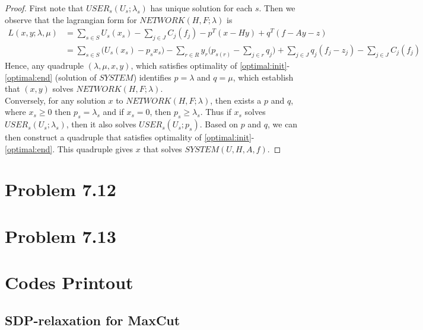 \documentclass[11pt,a4paper]{article}
\begin{document}
\begin{proof}
    First note that $USER_s(U_s;\lambda_s)$ has unique solution for each $s$.
    Then we observe that the lagrangian form for $NETWORK(H, F; \lambda)$ is 
    \begin{align}
    L(x, y; \lambda, \mu) 
    &= \sum_{s \in S} U_s(x_s) - \sum_{j \in J} C_j(f_j) 
    - p^T (x - H y) + q^T (f - A y - z) \\
    &= \sum_{s \in S} \big( U_s(x_s) -p_s x_s \big) 
    - \sum_{r \in R} y_r \big( p_{s(r)} - \sum_{j \in r} q_j \big)
    + \sum_{j \in J} q_j (f_j - z_j) -\sum_{j \in J} C_j(f_j)
    \end{align}
    Hence, any quadruple $(\lambda,\mu, x,y)$, which satisfies optimality of
    \ref{optimal:init}-\ref{optimal:end} (solution of $SYSTEM$) identifies $p=\lambda$ and
    $q=\mu$, which establish that $(x,y)$ solves $NETWORK(H, F; \lambda)$. \\
    Conversely, for any solution $x$ to $NETWORK(H, F; \lambda)$, then exists
    a $p$ and $q$, where $x_s \geq 0$ then $p_s=\lambda_s$ and if $x_s=0$,
    then $p_s \geq \lambda_s$. Thus if $x_s$ solves $USER_s(U_s;\lambda_s)$,
    then it also solves $USER_s(U_s;p_s)$. Based on $p$ and $q$, we can then
    construct a quadruple that satisfies optimality of \ref{optimal:init}-\ref{optimal:end}. This
    quadruple gives $x$ that solves $SYSTEM(U, H, A, f)$.
\end{proof}
\newpage
\section{Problem 7.12}

\newpage
\section{Problem 7.13}

\newpage
\appendix
\section{Codes Printout}

\subsection{SDP-relaxation for MaxCut}
%

\end{document}
